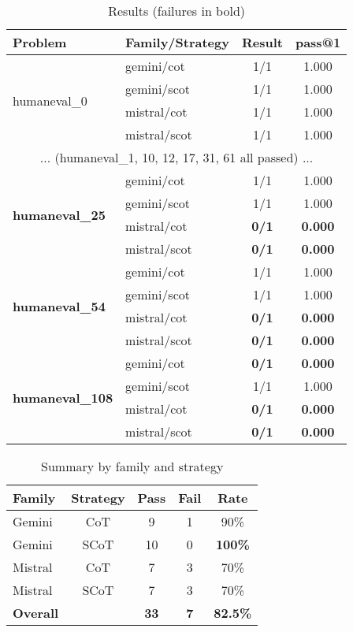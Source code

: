 \documentclass[11pt]{article}
\begin{document}
\begin{table}[h]
\centering
\footnotesize
\begin{tabular}{llcc}
\toprule
\textbf{Problem} & \textbf{Family/Strategy} & \textbf{Result} & \textbf{pass@1} \\
\midrule
\multirow{4}{*}{humaneval\_0} & gemini/cot & 1/1 & 1.000 \\
& gemini/scot & 1/1 & 1.000 \\
& mistral/cot & 1/1 & 1.000 \\
& mistral/scot & 1/1 & 1.000 \\
\midrule
\multicolumn{4}{c}{... (humaneval\_1, 10, 12, 17, 31, 61 all passed) ...} \\
\midrule
\multirow{4}{*}{\textbf{humaneval\_25}} & gemini/cot & 1/1 & 1.000 \\
& gemini/scot & 1/1 & 1.000 \\
& mistral/cot & \textbf{0/1} & \textbf{0.000} \\
& mistral/scot & \textbf{0/1} & \textbf{0.000} \\
\midrule
\multirow{4}{*}{\textbf{humaneval\_54}} & gemini/cot & 1/1 & 1.000 \\
& gemini/scot & 1/1 & 1.000 \\
& mistral/cot & \textbf{0/1} & \textbf{0.000} \\
& mistral/scot & \textbf{0/1} & \textbf{0.000} \\
\midrule
\multirow{4}{*}{\textbf{humaneval\_108}} & gemini/cot & \textbf{0/1} & \textbf{0.000} \\
& gemini/scot & 1/1 & 1.000 \\
& mistral/cot & \textbf{0/1} & \textbf{0.000} \\
& mistral/scot & \textbf{0/1} & \textbf{0.000} \\
\bottomrule
\end{tabular}
\caption{Results (failures in bold)}
\end{table}

\begin{table}[h]
\centering
\begin{tabular}{lcccc}
\toprule
\textbf{Family} & \textbf{Strategy} & \textbf{Pass} & \textbf{Fail} & \textbf{Rate} \\
\midrule
Gemini & CoT & 9 & 1 & 90\% \\
Gemini & SCoT & 10 & 0 & \textbf{100\%} \\
Mistral & CoT & 7 & 3 & 70\% \\
Mistral & SCoT & 7 & 3 & 70\% \\
\midrule
\textbf{Overall} & & \textbf{33} & \textbf{7} & \textbf{82.5\%} \\
\bottomrule
\end{tabular}
\caption{Summary by family and strategy}
\end{table}
\end{document}
